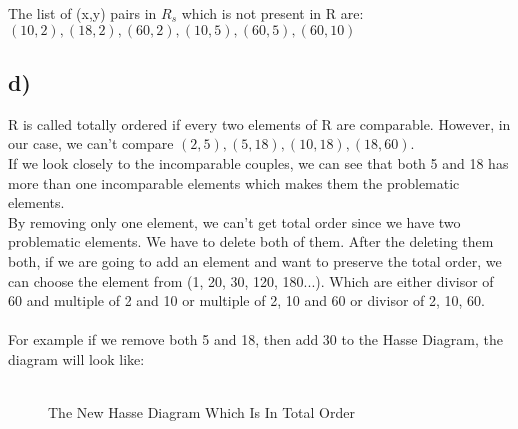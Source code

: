 \documentclass[12pt]{article}
\begin{document}
The list of (x,y) pairs in $R_s$ which is not present in R are:
$(10,2),(18,2),(60,2),(10,5),(60,5),(60,10)$\\
\subsection*{d) }
R is called totally ordered if every two elements of R are comparable. However, in our case, we can't compare $(2,5), (5,18), (10,18), (18,60)$.\\
If we look closely to the incomparable couples, we can see that both 5 and 18 has more than one incomparable elements which makes them the problematic elements.\\
By removing only one element, we can't get total order since we have two problematic elements. We have to delete both of them. After the deleting them both, if we are going to add an element and want to preserve the total order, we can choose the element from  (1, 20, 30, 120, 180...). Which are either divisor of 60 and multiple of 2 and 10 or multiple of 2, 10 and 60 or divisor of 2, 10, 60.\\
\\
For example if we remove both 5 and 18, then add 30 to the Hasse Diagram, the diagram will look like:\\
\\
\begin{figure}[H]
	\centering
\caption{The New Hasse Diagram Which Is In Total Order}
\end{figure}
\end{document}
